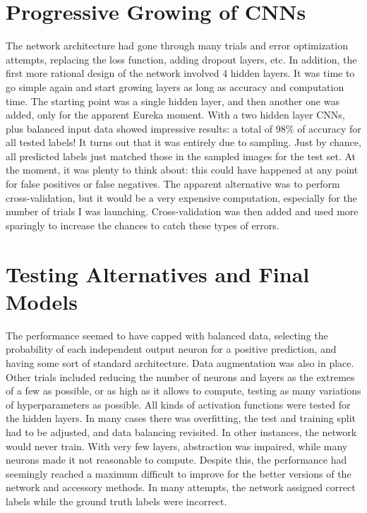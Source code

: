\documentclass{article}
\begin{document}
\section{Progressive Growing of CNNs}
The network architecture had gone through many trials and error optimization attempts, replacing the loss function, adding dropout layers, etc.
In addition, the first more rational design of the network involved 4 hidden layers.
It was time to go simple again and start growing layers as long as accuracy and computation time.
The starting point was a single hidden layer, and then another one was added, only for the apparent Eureka moment.
With a two hidden layer CNNs, plus balanced input data showed impressive results: a total of 98\% of accuracy for all tested labels!
It turns out that it was entirely due to sampling.
Just by chance, all predicted labels just matched those in the sampled images for the test set.
At the moment, it was plenty to think about: this could have happened at any point for false positives or false negatives.
The apparent alternative was to perform cross-validation, but it would be a very expensive computation, especially for the number of trials I was launching.
Cross-validation was then added and used more sparingly to increase the chances to catch these types of errors.


\section{Testing Alternatives and Final Models}
The performance seemed to have capped with balanced data, selecting the probability of each independent output neuron for a positive prediction, and having some sort of standard architecture.
Data augmentation was also in place.
Other trials included reducing the number of neurons and layers as the extremes of a few as possible, or as high as it allows to compute, testing as many variations of hyperparameters as possible.
All kinds of activation functions were tested for the hidden layers.
In many cases there was overfitting, the test and training split had to be adjusted, and data balancing revisited.
In other instances, the network would never train.
With very few layers, abstraction was impaired, while many neurons made it not reasonable to compute.
Despite this, the performance had seemingly reached a maximum difficult to improve for the better versions of the network and accessory methods.
In many attempts, the network assigned correct labels while the ground truth labels were incorrect.
\end{document}
